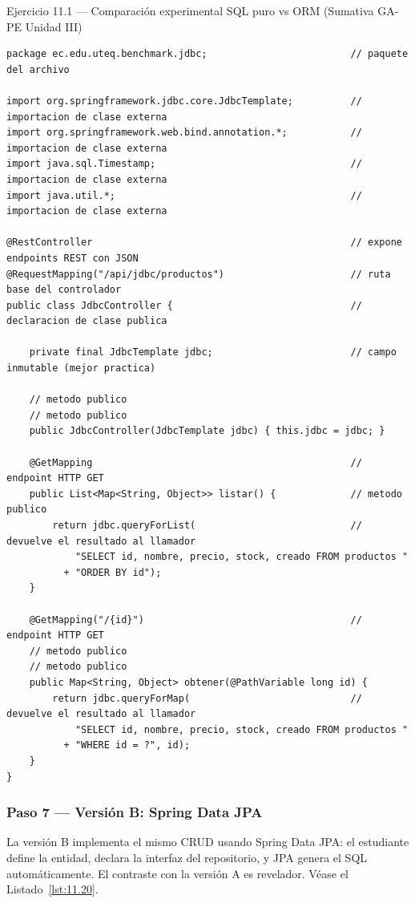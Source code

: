 \documentclass[11pt,a4paper,openany]{book}
\begin{document}
\begin{cajaejercicio}{Ejercicio 11.1 --- Comparación experimental SQL puro vs ORM (Sumativa GA-PE Unidad III)}
\begin{lstlisting}[style=java,caption={JdbcController.java},label=lst:11.19]
package ec.edu.uteq.benchmark.jdbc;                         // paquete del archivo

import org.springframework.jdbc.core.JdbcTemplate;          // importacion de clase externa
import org.springframework.web.bind.annotation.*;           // importacion de clase externa
import java.sql.Timestamp;                                  // importacion de clase externa
import java.util.*;                                         // importacion de clase externa

@RestController                                             // expone endpoints REST con JSON
@RequestMapping("/api/jdbc/productos")                      // ruta base del controlador
public class JdbcController {                               // declaracion de clase publica

    private final JdbcTemplate jdbc;                        // campo inmutable (mejor practica)

    // metodo publico
    // metodo publico
    public JdbcController(JdbcTemplate jdbc) { this.jdbc = jdbc; }

    @GetMapping                                             // endpoint HTTP GET
    public List<Map<String, Object>> listar() {             // metodo publico
        return jdbc.queryForList(                           // devuelve el resultado al llamador
            "SELECT id, nombre, precio, stock, creado FROM productos "
          + "ORDER BY id");
    }

    @GetMapping("/{id}")                                    // endpoint HTTP GET
    // metodo publico
    // metodo publico
    public Map<String, Object> obtener(@PathVariable long id) {
        return jdbc.queryForMap(                            // devuelve el resultado al llamador
            "SELECT id, nombre, precio, stock, creado FROM productos "
          + "WHERE id = ?", id);
    }
}
\end{lstlisting}

\subsubsection*{Paso 7 --- Versión B: Spring Data JPA}

La versión B implementa el mismo CRUD usando Spring Data
JPA: el estudiante define la entidad, declara la interfaz del
repositorio, y JPA genera el SQL automáticamente. El contraste con
la versión A es revelador. V\'ease el Listado~\ref{lst:11.20}.



\end{cajaejercicio}
\end{document}
